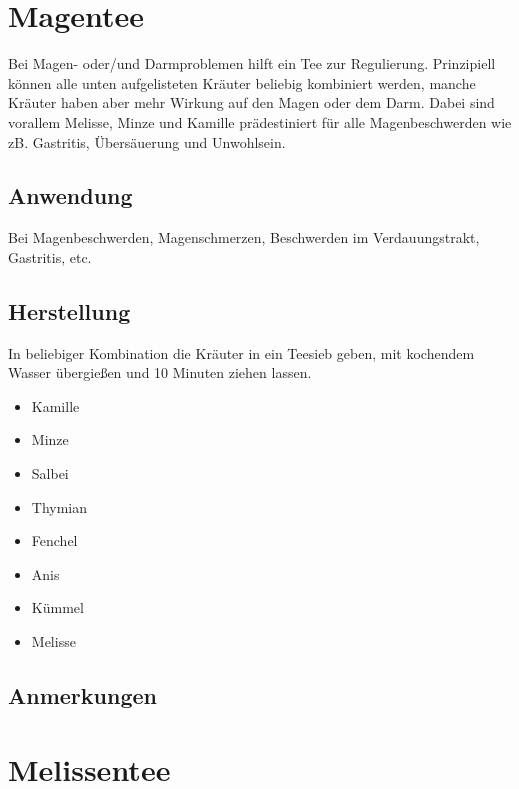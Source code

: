 \newpage


\section{Magentee}

Bei Magen- oder/und Darmproblemen hilft ein Tee zur Regulierung. Prinzipiell können alle unten aufgelisteten Kräuter beliebig kombiniert werden, manche Kräuter haben aber mehr Wirkung auf den Magen oder dem Darm. Dabei sind vorallem Melisse, Minze und Kamille prädestiniert für alle Magenbeschwerden wie zB. Gastritis, Übersäuerung und Unwohlsein.

   

\subsection{Anwendung}

Bei Magenbeschwerden, Magenschmerzen, Beschwerden im Verdauungstrakt, Gastritis, etc.


\subsection{Herstellung}

In beliebiger Kombination die Kräuter in ein Teesieb geben, mit kochendem Wasser übergießen und 10 Minuten ziehen lassen.

\begin{itemize}
	\item Kamille
	\item Minze
	\item Salbei
	\item Thymian
	\item Fenchel
	\item Anis
	\item Kümmel
	\item Melisse
\end{itemize}

\subsection{Anmerkungen}


\newpage


\section{Melissentee}

